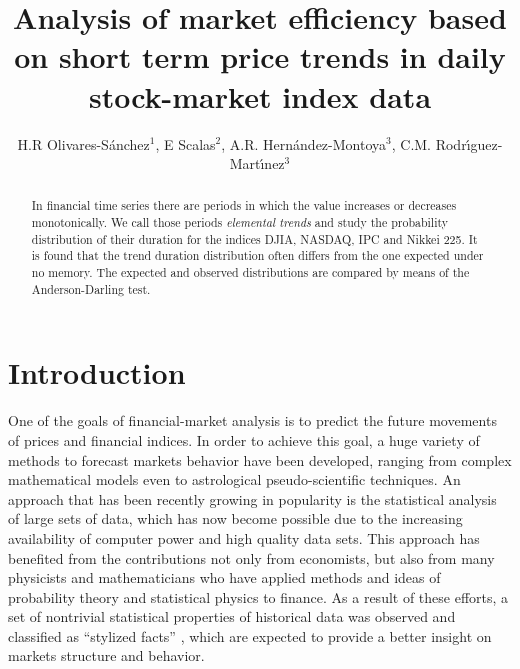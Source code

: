 \documentclass[a4paper]{jpconf}
\begin{document}
\title{Analysis of market efficiency based on short term price trends in daily stock-market index data}

\author{H.R Olivares-S\'anchez$^1$, E Scalas$^2$,  A.R. Hern\'andez-Montoya$^3$, C.M. Rodr\'{\i}guez-Mart\'{\i}nez$^3$}

\address{$^1$Facultad de F\'{\i}sica. Universidad Veracruzana, Apdo. Postal 475. Xalapa, Veracruz. M\'{e}xico.}

\address{$^2$Department of Economy, Sussex University.}

\address{$^3$Centro de Investigaci\'on en Inteligencia Artificial. Universidad Veracruzana. Sebasti\'an Camacho 5, Xalapa Veracruz 91000, M\'exico. Tel/Fax: 52-228-8172957/8172855.}



\begin{abstract}
In financial time series there are periods in which the value increases or decreases monotonically. We call those periods {\it elemental trends} and study the probability distribution of their duration for the indices DJIA, NASDAQ, IPC and Nikkei 225. It is found that the trend duration distribution often differs from the one expected under no memory. The expected and observed distributions are compared by means of the Anderson-Darling test.
\end{abstract}

\section{Introduction}
\label{intro}
One of the goals of financial-market analysis is to predict the future movements of prices and financial indices. In order to achieve this goal, a huge variety of methods to forecast markets behavior have been developed, ranging from complex mathematical models even to astrological pseudo-scientific techniques. An approach that has been recently growing in popularity is the statistical analysis of large sets of data, which has now become possible due to the increasing availability of computer power and high quality data sets. This approach has benefited from the contributions not only from economists, but also from many physicists and mathematicians who have applied methods and ideas of probability theory and statistical physics to finance. As a result of these efforts, a set of nontrivial statistical properties of historical data was observed and classified as ``stylized facts'' \cite{Rama}, which are expected to provide a better insight on markets structure and behavior.
\end{document}
